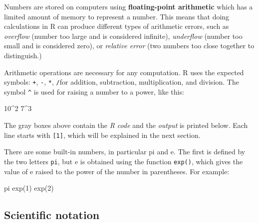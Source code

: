 \documentclass[
  letterpaper,
  DIV=11,
  numbers=noendperiod]{scrreprt}
\newenvironment{Shaded}{\begin{snugshade}}{\end{snugshade}}
\newcommand{\NormalTok}[1]{\textcolor[rgb]{0.00,0.23,0.31}{#1}}
\begin{document}
\begin{tcolorbox}[enhanced jigsaw, arc=.35mm, colframe=quarto-callout-note-color-frame, left=2mm, opacitybacktitle=0.6, breakable, title=\textcolor{quarto-callout-note-color}{\faInfo}\hspace{0.5em}{Computer arithmetic}, toprule=.15mm, coltitle=black, bottomtitle=1mm, toptitle=1mm, colback=white, leftrule=.75mm, colbacktitle=quarto-callout-note-color!10!white, titlerule=0mm, opacityback=0, rightrule=.15mm, bottomrule=.15mm]

Numbers are stored on computers using \textbf{floating-point arithmetic}
which has a limited amount of memory to represent a number. This means
that doing calculations in R can produce different types of arithmetic
errors, such as \emph{overflow} (number too large and is considered
infinite), \emph{underflow} (number too small and is considered zero),
or \emph{relative error} (two numbers too close together to
distinguish.)

\end{tcolorbox}

Arithmetic operations are necessary for any computation. R uses the
expected symbols: \texttt{+}, \texttt{-}, \texttt{*}, \texttt{/}for
addition, subtraction, multiplication, and division. The symbol
\texttt{\^{}} is used for raising a number to a power, like this:

\begin{Shaded}
\begin{Highlighting}[]
\NormalTok{10\^{}2 }
\NormalTok{7\^{}3}
\end{Highlighting}
\end{Shaded}

The gray boxes above contain the \emph{R code} and the \emph{output} is
printed below. Each line starts with \texttt{{[}1{]}}, which will be
explained in the next section.

There are some built-in numbers, in particular pi and e. The first is
defined by the two letters \texttt{pi}, but e is obtained using the
function \texttt{exp()}, which gives the value of e raised to the power
of the number in parentheses. For example:

\begin{Shaded}
\begin{Highlighting}[]
\NormalTok{pi}
\NormalTok{exp(1)}
\NormalTok{exp(2)}
\end{Highlighting}
\end{Shaded}

\hypertarget{scientific-notation}{%
\subsection*{Scientific notation}\label{scientific-notation}}
\end{document}
